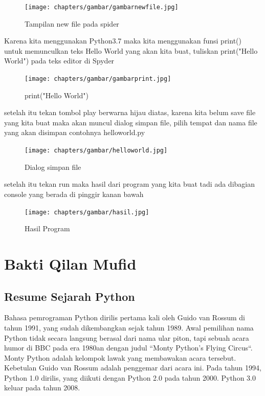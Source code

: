 \begin{figure}[!htbp]
  \centering
  \texttt{[image: chapters/gambar/gambarnewfile.jpg]}
  \caption{Tampilan new file pada spider}
\end{figure}

Karena kita menggunakan Python3.7 maka kita menggunakan funsi print() untuk memunculkan teks Hello World yang akan kita buat, tuliskan print("Hello World") pada teks editor di Spyder

\begin{figure}[!htbp]
  \centering
  \texttt{[image: chapters/gambar/gambarprint.jpg]}
  \caption{print("Hello World")}
\end{figure}

setelah itu tekan tombol play berwarna hijau diatas, karena kita belum save file yang kita buat maka akan muncul dialog simpan file, pilih tempat dan nama file yang akan disimpan contohnya helloworld.py

\begin{figure}[!htbp]
  \centering
  \texttt{[image: chapters/gambar/helloworld.jpg]}
  \caption{Dialog simpan file}
\end{figure}

setelah itu tekan run maka hasil dari program yang kita buat tadi ada dibagian console yang berada di pinggir kanan bawah

\begin{figure}[!htbp]
  \centering
  \texttt{[image: chapters/gambar/hasil.jpg]}
  \caption{Hasil Program}
\end{figure}


\section{Bakti Qilan Mufid}
\subsection{Resume Sejarah Python}
\begin{flushleft}
\qquad Bahasa pemrograman Python dirilis pertama kali oleh Guido van Rossum di tahun 1991, yang sudah dikembangkan sejak tahun 1989. Awal pemilihan nama Python tidak secara langsung berasal dari nama ular piton, tapi sebuah acara humor di BBC pada era 1980an dengan judul “Monty Python’s Flying Circus“. Monty Python adalah kelompok lawak yang membawakan acara tersebut. Kebetulan Guido van Rossum adalah penggemar dari acara ini. Pada tahun 1994, Python 1.0 dirilis, yang diikuti dengan Python 2.0 pada tahun 2000. Python 3.0 keluar pada tahun 2008.
\end{flushleft}
